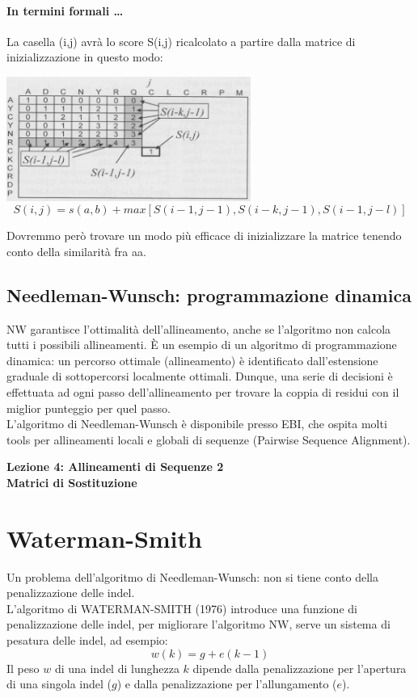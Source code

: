 \documentclass{article}
\begin{document}
\paragraph{In termini formali \dots} La casella (i,j) avrà lo score S(i,j)
ricalcolato a partire dalla matrice di inizializzazione in questo
modo:
\begin{center}
    \includegraphics[width=0.6\textwidth]{figures/otto.png}
    $$ S(i,j) = {s(a,b) + max[S(i-1,j-1),S(i-k,j-1),S(i-1,j-l)]}$$
\end{center}
Dovremmo però trovare un modo più efficace di inizializzare la
matrice tenendo conto della similarità fra aa.
\subsection{Needleman-Wunsch: programmazione dinamica}
NW garantisce l'ottimalità dell'allineamento, anche se l'algoritmo non
calcola tutti i possibili allineamenti.
È un esempio di un algoritmo di programmazione dinamica:
un percorso ottimale (allineamento) è identificato dall'estensione
graduale di sottopercorsi localmente ottimali.
Dunque, una serie di decisioni è effettuata ad ogni passo
dell'allineamento per trovare la coppia di residui con il miglior
punteggio per quel passo.\\
L'algoritmo di Needleman-Wunsch è disponibile presso
EBI, che ospita molti tools per allineamenti locali e globali di
sequenze (Pairwise Sequence Alignment).

\begin{titlepage}
    \begin{center}
        \vspace*{1cm}
        \LARGE
        \textbf{Lezione 4: Allineamenti di Sequenze 2\\Matrici di Sostituzione}

    \end{center}
\end{titlepage}
\section{Waterman-Smith}
Un problema dell'algoritmo di Needleman-Wunsch: non si
tiene conto della penalizzazione delle indel.\\
L'algoritmo di WATERMAN-SMITH (1976) introduce
una funzione di penalizzazione delle indel, per migliorare
l'algoritmo NW, serve un sistema di pesatura delle indel, ad esempio:
$$ w(k) = g + e(k-1)$$
Il peso $w$ di una indel di lunghezza $k$ dipende dalla
penalizzazione per l'apertura di una singola indel ($g$) e
dalla penalizzazione per l'allungamento ($e$).
\end{document}
